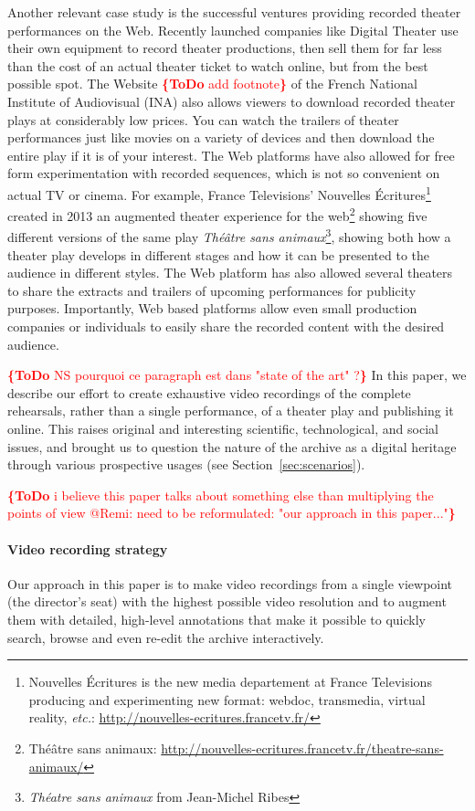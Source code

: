 \documentclass[conference]{IEEEtran}
\newcommand{\todo}[1]{\noindent\textcolor{red}{{\bf \{ToDo} #1{\bf \}}}}
\begin{document}
Another relevant case study  is the successful ventures providing recorded
theater performances on the Web. Recently launched companies like Digital Theater use their
own equipment to record theater productions, then sell them for far less than the cost of an
actual theater ticket to watch online, but from the best possible spot. The Website \todo{add footnote} of the French
National Institute of Audiovisual (INA) also allows viewers to download recorded theater plays
at considerably low prices. You can watch the trailers of theater performances just like movies
on a variety of devices and then download the entire play if it is of your interest. The Web platforms
have also allowed for free form experimentation with recorded sequences, which is not
so convenient on actual TV or cinema. For example, France Televisions' Nouvelles Écritures\footnote{Nouvelles Écritures is the new media departement at France Televisions producing and experimenting new format: webdoc, transmedia, virtual reality, \emph{etc.}: \url{http://nouvelles-ecritures.francetv.fr/}} created in 2013 an augmented theater experience for the web\footnote{Théâtre sans animaux: \url{http://nouvelles-ecritures.francetv.fr/theatre-sans-animaux/}} showing five different versions of the same play \emph{Théâtre sans animaux}\footnote{\emph{Théatre sans animaux} from Jean-Michel Ribes}, showing both how a theater play develops in different stages and how it can be presented to the audience in different styles. The Web platform has also allowed several theaters to share the extracts and trailers of upcoming performances for publicity purposes. Importantly, Web based platforms allow even small production companies or individuals to easily share the recorded content with the desired audience.

\todo{NS pourquoi ce paragraph est dans "state of the art" ?}
In this paper, we describe our effort to create exhaustive video recordings of the complete rehearsals, rather than a single performance, of a theater play and publishing it online. This raises original and interesting scientific, technological, and social issues, and brought us to question the nature of the archive as a digital heritage through various prospective usages (see Section~\ref{sec:scenarios}). 

\todo{i believe this paper talks about something else than multiplying the points of view @Remi: need to be reformulated: "our approach in this paper..."}
\paragraph*{Video recording strategy}
Our approach in this paper is to make video recordings from a single viewpoint (the director's seat) with the highest possible video resolution and to augment them with detailed, high-level  annotations that make it possible to quickly  search, browse and even re-edit the archive interactively. 
\end{document}
